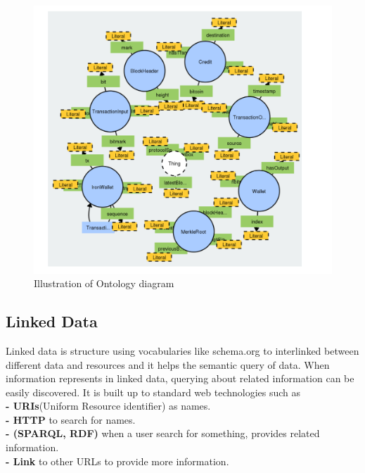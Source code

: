\begin{center}
	
	
	\begin{figure}[htb!]
		
		\begin{minipage}{0.55\linewidth}
			\centering
			\includegraphics[width=1.65\textwidth]{images/chap02_diagram_ontology.png}
		\end{minipage}
		\caption[Illustration of Ontology diagram]{Illustration of Ontology diagram\cite{Matthew}}
		
		
	\end{figure}
	
\end{center}

\subsection{Linked Data}
Linked data is structure using vocabularies like schema.org to interlinked between different data and resources and it helps the semantic query of data. When information represents in linked data, querying about related information can be easily discovered. It is built up to standard web technologies such as \\
\textbf{- URIs}(Uniform Resource identifier) as names.\\ 
\textbf{- HTTP} to search for names.\\
\textbf{- (SPARQL, RDF)}  when a user search for something, provides related information.\\
\textbf{- Link} to other URLs to provide more information\cite{Hector}.\\

